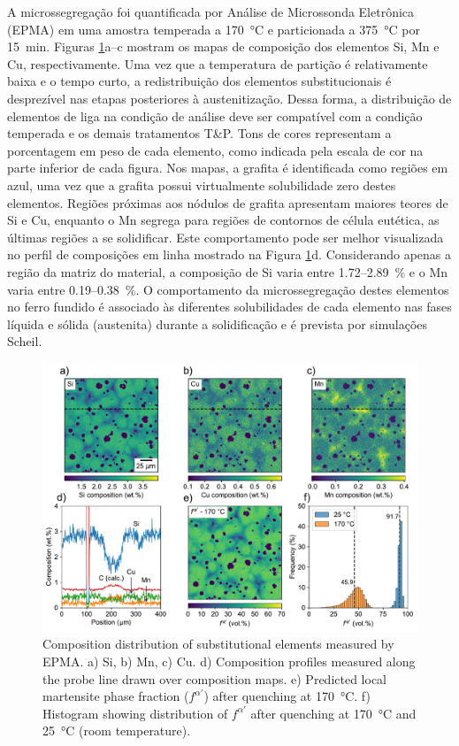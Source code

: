 A microssegregação foi quantificada por Análise de Microssonda Eletrônica (EPMA) em uma amostra temperada a 170~°C e particionada a 375~°C por 15~min. Figuras \ref{fig:EPMA}a--c mostram os mapas de composição dos elementos Si, Mn e Cu, respectivamente. Uma vez que a temperatura de partição é relativamente baixa e o tempo curto, a redistribuição dos elementos substitucionais é desprezível nas etapas posteriores à austenitização. Dessa forma, a distribuição de elementos de liga na condição de análise deve ser compatível com a condição temperada e os demais tratamentos T\&P. Tons de cores representam a porcentagem em peso de cada elemento, como indicada pela escala de cor na parte inferior de cada figura. Nos mapas, a grafita é identificada como regiões em azul, uma vez que a grafita possui virtualmente solubilidade zero destes elementos. Regiões próximas aos nódulos de grafita apresentam maiores teores de Si e Cu, enquanto o Mn segrega para regiões de contornos de célula eutética, as últimas regiões a se solidificar. Este comportamento pode ser melhor visualizada no perfil de composições em linha mostrado na Figura \ref{fig:EPMA}d. Considerando apenas a região da matriz do material, a composição de Si varia entre 1.72--2.89~\% e o Mn varia entre 0.19--0.38~\%. O comportamento da microssegregação destes elementos no ferro fundido é associado às diferentes solubilidades de cada elemento nas fases líquida e sólida (austenita) durante a solidificação e é prevista por simulações Scheil.

\begin{figure}
  \centering
  \includegraphics[width=.9\textwidth]{img/EPMA.pdf}
  \caption{Composition distribution of substitutional elements measured by EPMA. a) Si, b) Mn, c) Cu. d) Composition profiles measured along the probe line drawn over composition maps. e) Predicted local martensite phase fraction ($f^{\alpha'}$) after quenching at 170~°C. f) Histogram showing distribution of $f^{\alpha'}$ after quenching at 170~°C and 25~°C (room temperature).}
  \label{fig:EPMA}
\end{figure}

